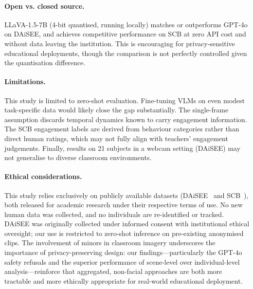 \paragraph{Open vs. closed source.}
LLaVA-1.5-7B (4-bit quantised, running locally) matches or outperforms
GPT-4o on DAiSEE, and achieves competitive performance on SCB at zero
API cost and without data leaving the institution.  This is
encouraging for privacy-sensitive educational deployments, though the
comparison is not perfectly controlled given the quantisation difference.

\paragraph{Limitations.}
This study is limited to zero-shot evaluation.  Fine-tuning VLMs on even
modest task-specific data would likely close the gap substantially.
The single-frame assumption discards temporal dynamics known to carry
engagement information.  The SCB engagement labels are derived from
behaviour categories rather than direct human ratings, which may not
fully align with teachers' engagement judgements.  Finally, results on
21 subjects in a webcam setting (DAiSEE) may not generalise to diverse
classroom environments.

\paragraph{Ethical considerations.}
This study relies exclusively on publicly available datasets
(DAiSEE~\cite{gupta2016daisee} and SCB~\cite{wang2023scb}), both
released for academic research under their respective
terms of use.  No new human data was collected, and no individuals
are re-identified or tracked.  DAiSEE was originally collected under
informed consent with institutional ethical oversight; our use is
restricted to zero-shot inference on pre-existing anonymised clips.
The involvement of minors in classroom imagery underscores the
importance of privacy-preserving design: our findings---particularly
the GPT-4o safety refusals and the superior performance of
scene-level over individual-level analysis---reinforce that
aggregated, non-facial approaches are both more tractable and more
ethically appropriate for real-world educational deployment.
